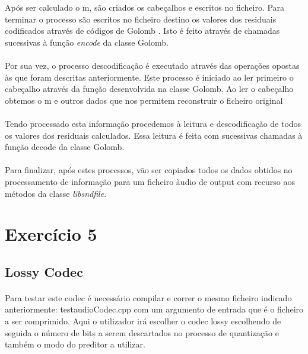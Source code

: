 \documentclass{report}
\begin{document}
Após ser calculado o m, são criados os cabeçalhos e escritos no ficheiro. Para terminar o processo são escritos no ficheiro destino os valores dos residuais codificados através de códigos de
Golomb . Isto é feito através de  chamadas sucessivas à função \textit{encode} da classe Golomb.

\paragraph{}
Por sua vez, o processo descodificação é executado através das operações opostas às que foram descritas anteriormente. Este processo é iniciado ao ler primeiro o cabeçalho através da função desenvolvida na classe Golomb. Ao ler o cabeçalho obtemos o m e outros dados que nos permitem reconstruir o ficheiro original  \paragraph{} Tendo processado esta informação procedemos à leitura e descodificação de todos os valores dos residuais calculados. Essa leitura é feita com sucessivas chamadas à função decode da classe Golomb.
\paragraph{}
Para finalizar, após estes processos, vão ser copiados todos os dados obtidos no processamento de informação para um ficheiro àudio de output com recurso aos métodos da classe \textit{libsndfile}.

\section{Exercício 5}
\subsection*{Lossy Codec}
\paragraph{}Para testar este codec é necessário compilar e correr o mesmo ficheiro indicado anteriormente: test\textunderscore audioCodec.cpp com um argumento de entrada que é o ficheiro a ser comprimido. Aqui o utilizador irá escolher o codec lossy escolhendo de seguida o número de bits a serem descartados no processo de quantização e também o modo do preditor a utilizar.
\paragraph{}
\end{document}
